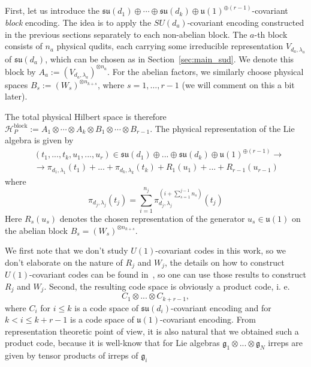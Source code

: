 \documentclass[10pt,twocolumn,superscriptaddress,aps,amsmath,amssymb,citeautoscript,floatfix,prx,longbibliography]{revtex4-2}
\newcounter{alg}
\theoremstyle{plain}
\theoremstyle{plain}
\theoremstyle{plain}
\theoremstyle{plain}
\theoremstyle{plain}
\theoremstyle{plain}
\begin{document}
First, let us introduce the \(\mathfrak{su}(d_1)\oplus\cdots\oplus\mathfrak{su}(d_k)\oplus \mathfrak{u}(1)^{\oplus(r-1)}\)-covariant \textit{block} encoding. The idea is to apply the \(SU(d_a)\)-covariant encoding constructed in the previous sections separately to each non-abelian block. The \(a\)-th block consists of \(n_a\) physical qudits, each carrying some irreducible representation \(V_{d_{a},\lambda_a}\) of \(\mathfrak{su}(d_a)\), which can be chosen as in Section~\ref{sec:main_sud}. We denote this block by \(A_a:=(V_{d_{a},\lambda_a})^{\otimes n_a}\). For the abelian factors, we similarly choose physical spaces \(B_s:=(W_s)^{\otimes n_{k+s}}\), where \(s=1,\ldots,r-1\) (we will comment on this a bit later).

The total physical Hilbert space is therefore \(\mathcal H_P^{\mathrm{block}}:=A_1\otimes\cdots\otimes A_k\otimes B_1\otimes\cdots\otimes B_{r-1}\). The physical representation of the Lie algebra is given by
\begin{equation}\label{eq:block_enc_def}
    \begin{aligned}
        &(t_1, ..., t_k, u_1, ..., u_r)\in \mathfrak{su}(d_1)\oplus...\oplus\mathfrak{su}(d_k)\oplus \mathfrak{u}(1)^{\oplus(r-1)} \longrightarrow \\ &\longrightarrow 
        \pi_{d_1, \lambda_1}(t_1)+...+\pi_{d_k, \lambda_k}(t_k)+ R_1(u_1) + ... + R_{r-1}(u_{r-1})
    \end{aligned}
\end{equation}
where 
\begin{equation}
    \pi_{d_j, \lambda_j}(t_j)=\sum_{i=1}^{n_j} \pi^{(i+\sum_{s=1}^{{j-1}}n_s)}_{d_j,\lambda_j}(t_j)
\end{equation}
Here \(R_s(u_s)\) denotes the chosen representation of the generator \(u_s\in\mathfrak{u}(1)\) on the abelian block \(B_s=(W_s)^{\otimes n_{k+s}}\). 

We first note that we don't study $U(1)$-covariant codes in this work, so we don't elaborate on the nature of $R_j$ and $W_j$,
the details on how to construct $U(1)$-covariant codes can be found in~\cite{Lin2025}, so one can use those results to construct $R_j$ and $W_j$. Second, the resulting code space is obviously a product code, i. e. 
\begin{equation}\label{eq:product_code}
    C_1\otimes...\otimes C_{k+r-1},
\end{equation} 
where $C_i$ for $i\leq k$ is a code space of $\mathfrak{su}(d_i)$-covariant encoding and
for $k < i \leq k+r-1$ is a code space of $\mathfrak{u}(1)$-covariant encoding. From representation
theoretic point of view, it is also natural that we obtained such a product code, because
it is well-know that for Lie algebras $\mathfrak{g}_1\otimes...\otimes \mathfrak{g}_N$
irreps are given by tensor products of irreps of $\mathfrak{g}_i$
\end{document}
